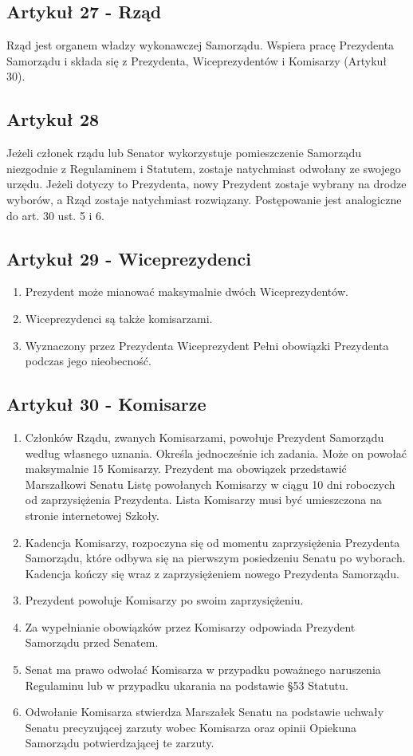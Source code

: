 \documentclass[14pt]{article}
\newenvironment{ustepy}{%
	\begin{enumerate}[leftmargin=1.5em, itemindent=1pt, labelwidth=1em, itemsep=5pt]
	}{%
	\end{enumerate}
}
\begin{document}
\subsection*{Artykuł 27 - Rząd}
Rząd jest organem władzy wykonawczej Samorządu. Wspiera pracę Prezydenta Samorządu i składa się z Prezydenta, Wiceprezydentów i Komisarzy (Artykuł 30).

\subsection*{Artykuł 28}
Jeżeli członek rządu lub Senator wykorzystuje pomieszczenie Samorządu niezgodnie z Regulaminem i Statutem, zostaje natychmiast odwołany ze swojego urzędu. Jeżeli dotyczy to Prezydenta, nowy Prezydent zostaje wybrany na drodze wyborów, a Rząd zostaje natychmiast rozwiązany. Postępowanie jest analogiczne do art. 30 ust. 5 i 6.

\subsection*{Artykuł 29 - Wiceprezydenci}
\begin{ustepy}
	\item Prezydent może mianować maksymalnie dwóch Wiceprezydentów. 
	\item Wiceprezydenci są także komisarzami.
	\item Wyznaczony przez Prezydenta Wiceprezydent Pełni obowiązki Prezydenta podczas jego nieobecność.
\end{ustepy}
\newpage
\subsection*{Artykuł 30 - Komisarze}
\begin{ustepy}
	\item Członków Rządu, zwanych Komisarzami, powołuje Prezydent Samorządu według własnego uznania. Określa jednocześnie ich zadania. Może on powołać maksymalnie 15 Komisarzy. Prezydent ma obowiązek przedstawić Marszałkowi Senatu Listę powołanych Komisarzy w ciągu 10 dni roboczych od zaprzysiężenia Prezydenta. Lista Komisarzy musi być umieszczona na stronie internetowej Szkoły.
	\item Kadencja Komisarzy, rozpoczyna się od momentu zaprzysiężenia Prezydenta Samorządu, które odbywa się na pierwszym posiedzeniu Senatu po wyborach. Kadencja kończy się wraz z zaprzysiężeniem nowego Prezydenta Samorządu.
	\item Prezydent powołuje Komisarzy po swoim zaprzysiężeniu.
	\item Za wypełnianie obowiązków przez Komisarzy odpowiada Prezydent Samorządu przed Senatem.
	\item Senat ma prawo odwołać Komisarza w przypadku poważnego naruszenia Regulaminu lub w przypadku ukarania na podstawie §53 Statutu.
	\item Odwołanie Komisarza stwierdza Marszałek Senatu na podstawie uchwały Senatu precyzującej zarzuty wobec Komisarza oraz opinii Opiekuna Samorządu potwierdzającej te zarzuty.
\end{ustepy}
\end{document}
